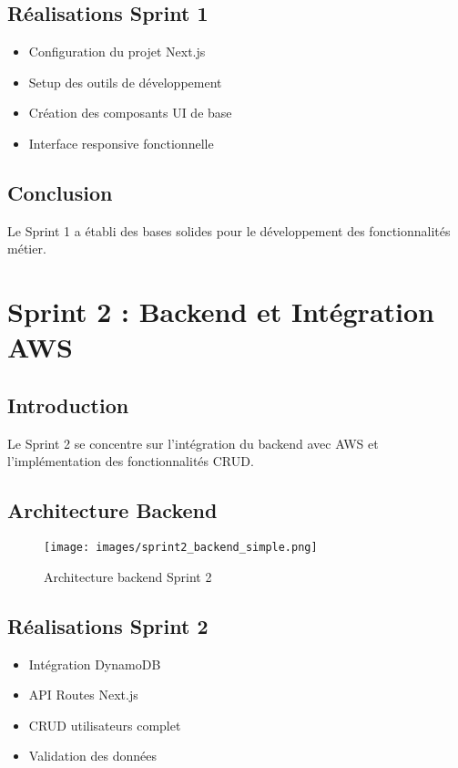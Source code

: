 \begin{table}[H]
\subsection{Réalisations Sprint 1}

\begin{itemize}
    \item Configuration du projet Next.js
    \item Setup des outils de développement
    \item Création des composants UI de base
    \item Interface responsive fonctionnelle
\end{itemize}

\subsection{Conclusion}

Le Sprint 1 a établi des bases solides pour le développement des fonctionnalités métier.

\section{Sprint 2 : Backend et Intégration AWS}

\subsection{Introduction}

Le Sprint 2 se concentre sur l'intégration du backend avec AWS et l'implémentation des fonctionnalités CRUD.

\subsection{Architecture Backend}

\begin{figure}[H]
    \centering
    \texttt{[image: images/sprint2\_backend\_simple.png]}
    \caption{Architecture backend Sprint 2}
    \label{fig:sprint2_backend}
\end{figure}

\subsection{Réalisations Sprint 2}

\begin{itemize}
    \item Intégration DynamoDB
    \item API Routes Next.js
    \item CRUD utilisateurs complet
    \item Validation des données
\end{itemize}


\end{table}
